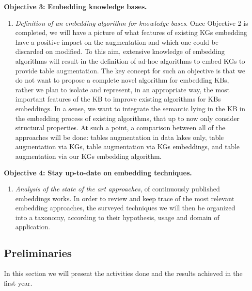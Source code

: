 \noindent\textbf{Objective 3: Embedding knowledge bases.}
\begin{enumerate}
    \item \textit{Definition of an embedding algorithm for knowledge bases}. Once Objective 2 is completed, we will have a picture of what features of existing KGs embedding have a positive impact on the augmentation and which one could be discarded on modified. To this aim, extensive knowledge of embedding algorithms will result in the definition of ad-hoc algorithms to embed KGs to provide table augmentation. The key concept for such an objective is that we do not want to propose a complete novel algorithm for embedding KBs, rather we plan to isolate and represent, in an appropriate way, the most important features of the KB to improve existing algorithms for KBs embeddings. In a sense, we want to integrate the semantic lying in the KB in the embedding process of existing algorithms, that up to now only consider structural properties. At such a point, a comparison between all of the approaches will be done: tables augmentation in data lakes only, table augmentation via KGs, table augmentation via KGs embeddings, and table augmentation via our KGs embedding algorithm.
\end{enumerate}

\noindent\textbf{Objective 4: Stay up-to-date on embedding techniques.}
\begin{enumerate}
    \item \textit{Analysis of the state of the art approaches}, of continuously published embeddings works. In order to review and keep trace of the most relevant embedding approaches, the surveyed techniques we will then be organized into a taxonomy, according to their hypothesis, usage and domain of application.
\end{enumerate}



\subsection{Preliminaries}\label{sub_preliminaries}
In this section we will present the activities done and the results achieved in the first year.

